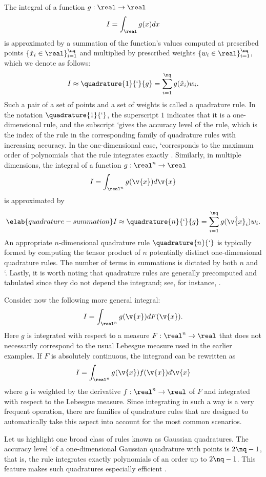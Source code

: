 The integral of a function $g: \real \to \real$
\[
  I = \int_\real g(x) dx
\]
is approximated by a summation of the function's values computed at prescribed
points $\{ \hat{x}_i \in \real \}_{i = 1}^\nq$ and multiplied by prescribed
weights $\{ w_i \in \real \}_{i = 1}^\nq$, which we denote as follows:
\[
  I \approx \quadrature{1}{\lq}{g} = \sum_{i = 1}^\nq g(\hat{x}_i) w_i.
\]
Such a pair of a set of points and a set of weights is called a quadrature rule.
In the notation $\quadrature{1}{\lq}$, the superscript $1$ indicates that it is
a one-dimensional rule, and the subscript \lq gives the accuracy level of the
rule, which is the index of the rule in the corresponding family of quadrature
rules with increasing accuracy. In the one-dimensional case, \lq corresponds to
the maximum order of polynomials that the rule integrates exactly
\cite{heiss2008}. Similarly, in multiple dimensions, the integral of a function
$g: \real^n \to \real$
\[
  I = \int_{\real^n} g(\v{x}) d\v{x}
\]
is approximated by
\begin{equation} \elab{quadrature-summation}
  I \approx \quadrature{n}{\lq}{g} = \sum_{i = 1}^\nq g(\hat{\v{x}}_i) w_i.
\end{equation}
An appropriate $n$-dimensional quadrature rule $\quadrature{n}{\lq}$ is
typically formed by computing the tensor product of $n$ potentially distinct
one-dimensional quadrature rules. The number of terms \nq in summations is
dictated by both $n$ and \lq. Lastly, it is worth noting that quadrature rules
are generally precomputed and tabulated since they do not depend the integrand;
see, for instance, \cite{burkardt}.

Consider now the following more general integral:
\[
  I = \int_{\real^n} g(\v{x}) dF(\v{x}).
\]
Here $g$ is integrated with respect to a measure $F: \real^n \to \real$
\cite{durrett2010} that does not necessarily correspond to the usual Lebesgue
measure used in the earlier examples. If $F$ is absolutely continuous, the
integrand can be rewritten as
\[
  I = \int_{\real^n} g(\v{x}) f(\v{x}) d\v{x}
\]
where $g$ is weighted by the derivative $f: \real^n \to \real$ of $F$ and
integrated with respect to the Lebesgue measure. Since integrating in such a way
is a very frequent operation, there are families of quadrature rules that are
designed to automatically take this aspect into account for the most common
scenarios.

Let us highlight one broad class of rules known as Gaussian quadratures. The
accuracy level \lq of a one-dimensional Gaussian quadrature with \nq points is
$2 \nq - 1$, that is, the rule integrates exactly polynomials of an order up to
$2 \nq - 1$. This feature makes such quadratures especially efficient
\cite{heiss2008}.

